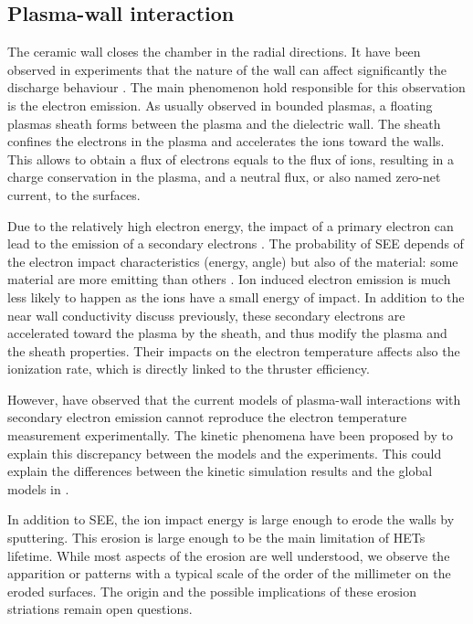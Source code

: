 \subsection*{Plasma-wall interaction}

  The ceramic wall closes the chamber in the radial directions.
  It have been observed in experiments that the nature of the wall can affect significantly the discharge behaviour \citep{gascon2003}.
  The main phenomenon hold responsible for this observation is the electron emission.
  As usually observed in bounded plasmas, a floating plasmas sheath forms between the plasma and the dielectric wall.
  The sheath confines the electrons in the plasma and accelerates the ions toward the walls.
  This allows to obtain a flux of electrons equals to the flux of ions, resulting in a charge conservation in the plasma, and a neutral flux, or also named zero-net current, to the surfaces.
  
  Due to the relatively high electron energy, the impact of a primary electron can lead to the emission of a secondary electrons \citep{barral2003a,villemant2018}.
  The probability of \ac{SEE} depends of the electron impact characteristics (energy, angle) but also of the material\string: some material are more emitting than others \citep{gascon2003}.
  Ion induced electron emission is much less likely to happen as the ions have a small energy of impact.
  In addition to the near wall conductivity discuss previously, these secondary electrons are accelerated toward the plasma by the sheath, and thus modify the plasma and the sheath properties.
  Their impacts on the electron temperature affects also the ionization rate, which is directly linked to the thruster efficiency.
  
  
  However, \citet{raitses2005} have observed that the current models of plasma-wall interactions with secondary electron emission cannot reproduce the electron temperature measurement experimentally.
  The kinetic phenomena have been proposed by \citet{sydorenko2007} to explain this discrepancy between the models and the experiments.
  This could explain the differences between the kinetic simulation results and the global models in \citet{croes2017}.   
    
  \vspace{1em}
  In addition to \ac{SEE}, the ion impact energy is large enough to erode the walls by sputtering.
  This erosion is large enough to be the main limitation of \ac{HET}s lifetime.
  While most aspects of the erosion are well understood, we observe the apparition or  patterns with a typical scale of the order of the millimeter on the eroded surfaces.
  The origin and the possible implications of these erosion striations remain open questions.
  

